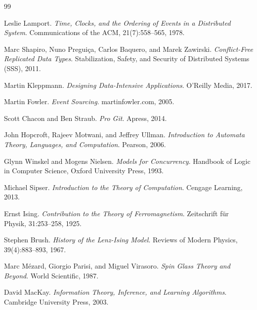 \documentclass[12pt]{article}
\begin{document}
\begin{thebibliography}{99}

Leslie Lamport.
\textit{Time, Clocks, and the Ordering of Events in a Distributed System}.
Communications of the ACM, 21(7):558--565, 1978.

Marc Shapiro, Nuno Preguiça, Carlos Baquero, and Marek Zawirski.
\textit{Conflict-Free Replicated Data Types}.
Stabilization, Safety, and Security of Distributed Systems (SSS), 2011.

Martin Kleppmann.
\textit{Designing Data-Intensive Applications}.
O’Reilly Media, 2017.

Martin Fowler.
\textit{Event Sourcing}.
martinfowler.com, 2005.

Scott Chacon and Ben Straub.
\textit{Pro Git}.
Apress, 2014.

John Hopcroft, Rajeev Motwani, and Jeffrey Ullman.
\textit{Introduction to Automata Theory, Languages, and Computation}.
Pearson, 2006.

Glynn Winskel and Mogens Nielsen.
\textit{Models for Concurrency}.
Handbook of Logic in Computer Science, Oxford University Press, 1993.

Michael Sipser.
\textit{Introduction to the Theory of Computation}.
Cengage Learning, 2013.

Ernst Ising.
\textit{Contribution to the Theory of Ferromagnetism}.
Zeitschrift für Physik, 31:253--258, 1925.

Stephen Brush.
\textit{History of the Lenz-Ising Model}.
Reviews of Modern Physics, 39(4):883--893, 1967.

Marc Mézard, Giorgio Parisi, and Miguel Virasoro.
\textit{Spin Glass Theory and Beyond}.
World Scientific, 1987.

David MacKay.
\textit{Information Theory, Inference, and Learning Algorithms}.
Cambridge University Press, 2003.

\end{thebibliography}
\end{document}
